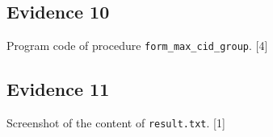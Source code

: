 \subsection*{Evidence 10 }

Program code of procedure \texttt{form\_max\_cid\_group}. \hfill{}{[}4{]}

\subsection*{Evidence 11 }

Screenshot of the content of \textquotedbl\texttt{result.txt}\textquotedbl .
\hfill{}{[}1{]}